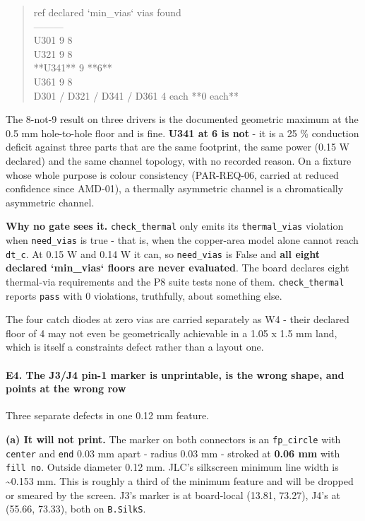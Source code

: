 \documentclass[11pt,a4paper]{article}
\begin{document}
\begin{quote}\small\ttfamily\raggedright
\textbar{} ref \textbar{} declared `min\_vias` \textbar{} vias found \textbar{}\\
\textbar{}---\textbar{}---\textbar{}---\textbar{}\\
\textbar{} U301 \textbar{} 9 \textbar{} 8 \textbar{}\\
\textbar{} U321 \textbar{} 9 \textbar{} 8 \textbar{}\\
\textbar{} {*}{*}U341{*}{*} \textbar{} 9 \textbar{} {*}{*}6{*}{*} \textbar{}\\
\textbar{} U361 \textbar{} 9 \textbar{} 8 \textbar{}\\
\textbar{} D301 / D321 / D341 / D361 \textbar{} 4 each \textbar{} {*}{*}0 each{*}{*} \textbar{}
\end{quote}
The 8-not-9 result on three drivers is the documented geometric maximum at the 0.5 mm hole-to-hole floor and is fine. \textbf{U341 at 6 is not} - it is a 25 \% conduction deficit against three parts that are the same footprint, the same power (0.15 W declared) and the same channel topology, with no recorded reason. On a fixture whose whole purpose is colour consistency (PAR-REQ-06, carried at reduced confidence since AMD-01), a thermally asymmetric channel is a chromatically asymmetric channel.

\textbf{Why no gate sees it.} \texttt{check\_thermal} only emits its \texttt{thermal\_vias} violation when \texttt{need\_vias} is true - that is, when the copper-area model alone cannot reach \texttt{dt\_c}. At 0.15 W and 0.14 W it can, so \texttt{need\_vias} is False and \textbf{all eight declared `min\_vias` floors are never evaluated}. The board declares eight thermal-via requirements and the P8 suite tests none of them. \texttt{check\_thermal} reports \texttt{pass} with 0 violations, truthfully, about something else.

The four catch diodes at zero vias are carried separately as W4 - their declared floor of 4 may not even be geometrically achievable in a 1.05 x 1.5 mm land, which is itself a constraints defect rather than a layout one.

\paragraph*{E4. The J3/J4 pin-1 marker is unprintable, is the wrong shape, and points at the wrong row}
Three separate defects in one 0.12 mm feature.

\textbf{(a) It will not print.} The marker on both connectors is an \texttt{fp\_circle} with \texttt{center} and \texttt{end} 0.03 mm apart - radius 0.03 mm - stroked at \textbf{0.06 mm} with \texttt{fill no}. Outside diameter 0.12 mm. JLC's silkscreen minimum line width is \textasciitilde{}0.153 mm. This is roughly a third of the minimum feature and will be dropped or smeared by the screen. J3's marker is at board-local (13.81, 73.27), J4's at (55.66, 73.33), both on \texttt{B.SilkS}.
\end{document}
